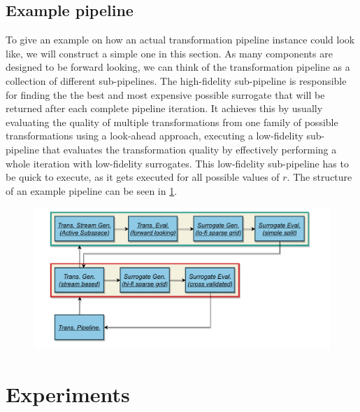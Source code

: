 \documentclass[
  a4paper,  %
  twoside,  %
  bibliography=totoc,
  headsepline,
  cleardoublepage=empty,
  parskip=half,
  draft=false
]{scrbook}
\begin{document}
\newpage
\section{Example pipeline}

To give an example on how an actual transformation pipeline instance could look like, we will construct a simple one in this section.
As many components are designed to be forward looking, we can think of the transformation pipeline as a collection of different sub-pipelines.
The high-fidelity sub-pipeline is responsible for finding the the best and most expensive possible surrogate that will be returned after each complete pipeline iteration.
It achieves this by usually evaluating the quality of multiple transformations from one family of possible transformations using a look-ahead approach, \ie executing a low-fidelity sub-pipeline that evaluates the transformation quality by effectively performing a whole iteration with low-fidelity surrogates.
This low-fidelity sub-pipeline has to be quick to execute, as it gets executed for all possible values of $r$.
The structure of an example pipeline can be seen in \cref{fig:tpex}.

\begin{mdframed}[style=style]
\begin{figure}[H]
\includegraphics[width=\textwidth]{graphics/PipelineExample.pdf}
\delimit

\label{fig:tpex}
\end{figure}
\end{mdframed}

\chapter{Experiments}
\label{chap:c7}
\end{document}

